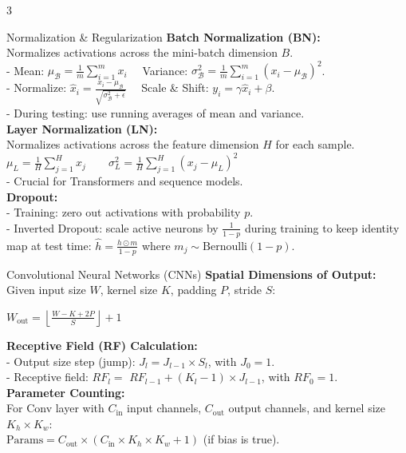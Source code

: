 \documentclass[10pt]{article}
\begin{document}
\begin{multicols*}{3}
\columnbreak

\begin{dlBox}{Normalization \& Regularization}
\textbf{Batch Normalization (BN):} \\
Normalizes activations across the mini-batch dimension $B$. \\
- Mean: $\mu_{\mathcal{B}} = \frac{1}{m} \sum_{i=1}^m x_i \quad$ Variance: $\sigma_{\mathcal{B}}^2 = \frac{1}{m} \sum_{i=1}^m (x_i - \mu_{\mathcal{B}})^2$. \\
- Normalize: $\hat{x}_i = \frac{x_i - \mu_{\mathcal{B}}}{\sqrt{\sigma_{\mathcal{B}}^2 + \epsilon}} \quad$ Scale \& Shift: $y_i = \gamma \hat{x}_i + \beta$. \\
- During testing: use running averages of mean and variance. \\
\textbf{Layer Normalization (LN):} \\
Normalizes activations across the feature dimension $H$ for each sample. \\
$\mu_L = \frac{1}{H} \sum_{j=1}^H x_j \qquad \sigma_L^2 = \frac{1}{H} \sum_{j=1}^H (x_j - \mu_L)^2$ \\
- Crucial for Transformers and sequence models. \\
\textbf{Dropout:} \\
- Training: zero out activations with probability $p$. \\
- Inverted Dropout: scale active neurons by $\frac{1}{1-p}$ during training to keep identity map at test time: $\hat{h} = \frac{h \odot m}{1-p}$ where $m_j \sim \text{Bernoulli}(1-p)$.
\end{dlBox}

\begin{dlBox}{Convolutional Neural Networks (CNNs)}
\textbf{Spatial Dimensions of Output:} \\
Given input size $W$, kernel size $K$, padding $P$, stride $S$: \\
{\centering $W_{\text{out}} = \left\lfloor \frac{W - K + 2P}{S} \right\rfloor + 1$\par}
\textbf{Receptive Field (RF) Calculation:} \\
- Output size step (jump): $J_l = J_{l-1} \times S_l$, with $J_0 = 1$. \\
- Receptive field: $RF_l = $ $RF_{l-1} + (K_l - 1) \times J_{l-1}$, with $RF_0 = 1$. \\
\textbf{Parameter Counting:} \\
For Conv layer with $C_{\text{in}}$ input channels, $C_{\text{out}}$ output channels, and kernel size $K_h \times K_w$: \\
$\text{Params} = C_{\text{out}} \times (C_{\text{in}} \times K_h \times K_w + 1)$ (if bias is true).
\end{dlBox}


\end{multicols*}
\end{document}
